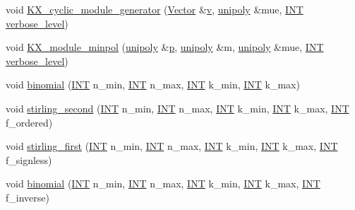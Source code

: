 \begin{DoxyCompactItemize}
\item 
void \mbox{\hyperlink{classmatrix_ace9dbe1f348d6fa63d1005e8f601897b}{K\+X\+\_\+cyclic\+\_\+module\+\_\+generator}} (\mbox{\hyperlink{class_vector}{Vector}} \&\mbox{\hyperlink{simeon_8_c_aeb3f3030944801b163bc3b829a7f6710}{v}}, \mbox{\hyperlink{classunipoly}{unipoly}} \&mue, \mbox{\hyperlink{galois_8h_a09fddde158a3a20bd2dcadb609de11dc}{I\+NT}} \mbox{\hyperlink{simeon_8_c_a818073fbcc2f439e7c56952f67386122}{verbose\+\_\+level}})
\item 
void \mbox{\hyperlink{classmatrix_ad8b6174329495126b165154d074bbcff}{K\+X\+\_\+module\+\_\+minpol}} (\mbox{\hyperlink{classunipoly}{unipoly}} \&\mbox{\hyperlink{alphabet2_8_c_a533391314665d6bf1b5575e9a9cd8552}{p}}, \mbox{\hyperlink{classunipoly}{unipoly}} \&m, \mbox{\hyperlink{classunipoly}{unipoly}} \&mue, \mbox{\hyperlink{galois_8h_a09fddde158a3a20bd2dcadb609de11dc}{I\+NT}} \mbox{\hyperlink{simeon_8_c_a818073fbcc2f439e7c56952f67386122}{verbose\+\_\+level}})
\item 
void \mbox{\hyperlink{classmatrix_af3908604699f48d25012d6500de591f0}{binomial}} (\mbox{\hyperlink{galois_8h_a09fddde158a3a20bd2dcadb609de11dc}{I\+NT}} n\+\_\+min, \mbox{\hyperlink{galois_8h_a09fddde158a3a20bd2dcadb609de11dc}{I\+NT}} n\+\_\+max, \mbox{\hyperlink{galois_8h_a09fddde158a3a20bd2dcadb609de11dc}{I\+NT}} k\+\_\+min, \mbox{\hyperlink{galois_8h_a09fddde158a3a20bd2dcadb609de11dc}{I\+NT}} k\+\_\+max)
\item 
void \mbox{\hyperlink{classmatrix_a0e7366c1db2c447d83f71f2c369e8d1d}{stirling\+\_\+second}} (\mbox{\hyperlink{galois_8h_a09fddde158a3a20bd2dcadb609de11dc}{I\+NT}} n\+\_\+min, \mbox{\hyperlink{galois_8h_a09fddde158a3a20bd2dcadb609de11dc}{I\+NT}} n\+\_\+max, \mbox{\hyperlink{galois_8h_a09fddde158a3a20bd2dcadb609de11dc}{I\+NT}} k\+\_\+min, \mbox{\hyperlink{galois_8h_a09fddde158a3a20bd2dcadb609de11dc}{I\+NT}} k\+\_\+max, \mbox{\hyperlink{galois_8h_a09fddde158a3a20bd2dcadb609de11dc}{I\+NT}} f\+\_\+ordered)
\item 
void \mbox{\hyperlink{classmatrix_a9041c3138924ebc58d539c9230898c6d}{stirling\+\_\+first}} (\mbox{\hyperlink{galois_8h_a09fddde158a3a20bd2dcadb609de11dc}{I\+NT}} n\+\_\+min, \mbox{\hyperlink{galois_8h_a09fddde158a3a20bd2dcadb609de11dc}{I\+NT}} n\+\_\+max, \mbox{\hyperlink{galois_8h_a09fddde158a3a20bd2dcadb609de11dc}{I\+NT}} k\+\_\+min, \mbox{\hyperlink{galois_8h_a09fddde158a3a20bd2dcadb609de11dc}{I\+NT}} k\+\_\+max, \mbox{\hyperlink{galois_8h_a09fddde158a3a20bd2dcadb609de11dc}{I\+NT}} f\+\_\+signless)
\item 
void \mbox{\hyperlink{classmatrix_a58a9004174ad450f80faba4db8c1be1c}{binomial}} (\mbox{\hyperlink{galois_8h_a09fddde158a3a20bd2dcadb609de11dc}{I\+NT}} n\+\_\+min, \mbox{\hyperlink{galois_8h_a09fddde158a3a20bd2dcadb609de11dc}{I\+NT}} n\+\_\+max, \mbox{\hyperlink{galois_8h_a09fddde158a3a20bd2dcadb609de11dc}{I\+NT}} k\+\_\+min, \mbox{\hyperlink{galois_8h_a09fddde158a3a20bd2dcadb609de11dc}{I\+NT}} k\+\_\+max, \mbox{\hyperlink{galois_8h_a09fddde158a3a20bd2dcadb609de11dc}{I\+NT}} f\+\_\+inverse)

\end{DoxyCompactItemize}
